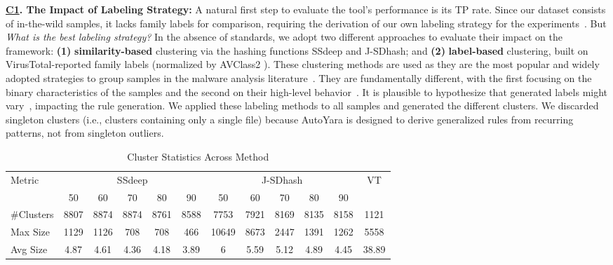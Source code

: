 \noindent \textbf{\underline{C1}. The Impact of Labeling Strategy: }A natural first step to evaluate the tool's performance is its TP rate. Since our dataset consists of in-the-wild samples, it lacks family labels for comparison, requiring the derivation of our own labeling strategy for the experiments~\cite{JOYCE2021_AGTR}. But \textit{What is the best labeling strategy?} In the absence of standards, we adopt two different approaches to evaluate their impact on the framework: \textbf{(1)} \textbf{similarity-based} clustering via the hashing functions SSdeep and J-SDhash; and \textbf{(2)} \textbf{label-based} clustering, built on VirusTotal-reported family labels (normalized by AVClass2 \cite{DBLP:journals/corr/abs-2006-10615}). These clustering methods are used as they are the most popular and widely adopted strategies to group samples in the malware analysis literature~\cite{JOYCE2021_AGTR,lee2019dexofuzzy,10.1016/j.cose.2022.102921,kornblum2006identifying}. They are fundamentally different, with the first focusing on the binary characteristics of the samples and the second on their high-level behavior~\cite{vitale2025polymorphism}. It is plausible to hypothesize that generated labels might vary~\cite{botacin2021_ssdeephashing}, impacting the rule generation. We applied these labeling methods to all samples and generated the different clusters. We discarded singleton clusters (i.e., clusters containing only a single file) because AutoYara is designed to derive generalized rules from recurring patterns, not from singleton outliers.


\begin{table}[ht]
\centering
\scriptsize
\setlength{\tabcolsep}{1.5pt}
\vspace{-2mm}
\caption{Cluster Statistics Across Method}
\label{tab:ClusterStats}
\vspace{-3mm}
\begin{tabular}{lccccccccccc}
\toprule
\multirow{2}{*}{Metric}
& \multicolumn{5}{c}{SSdeep}
& \multicolumn{5}{c}{J-SDhash}
& VT \\
\cmidrule(lr){2-6}
\cmidrule(lr){7-11}
& 50 & 60 & 70 & 80 & 90
& 50 & 60 & 70 & 80 & 90
& \\
\midrule
\#Clusters & 8807 & 8874 & 8874 & 8761 & 8588 & 7753 & 7921 & 8169 & 8135 & 8158 & 1121 \\
Max Size & 1129 & 1126 & 708 & 708 & 466 & 10649 & 8673 & 2447 & 1391 & 1262 & 5558 \\
Avg Size & 4.87 & 4.61 & 4.36 & 4.18 & 3.89 & 6 & 5.59 & 5.12 & 4.89 & 4.45 & 38.89 \\
\bottomrule
\end{tabular}

\vspace{-2mm}

\end{table}

